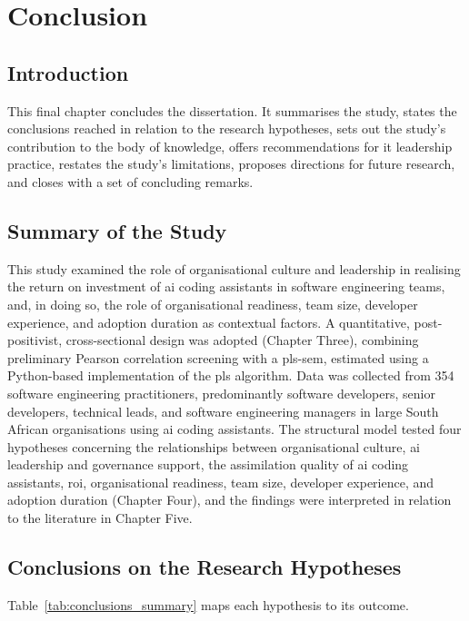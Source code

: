 \chapter{Conclusion} %
\label{cha:ch6_conclusion} %

\section{Introduction}
\label{sec:Ch6 Introduction}
This final chapter concludes the dissertation. It summarises the study, states the conclusions reached in relation to the research hypotheses, sets out the study's contribution to the body of knowledge, offers recommendations for \gls{it}  leadership practice, restates the study's limitations, proposes directions for future research, and closes with a set of concluding remarks.

\section{Summary of the Study}
\label{sec:Summary of the Study}
This study examined the role of organisational culture and leadership in realising the return on investment of \gls{ai} coding assistants in software engineering teams, and, in doing so, the role of organisational readiness, team size, developer experience, and adoption duration as contextual factors. A quantitative, post-positivist, cross-sectional design was adopted (Chapter Three), combining preliminary Pearson correlation screening with a \gls{pls-sem}, estimated using a Python-based implementation of the \gls{pls} algorithm. Data was collected from 354 software engineering practitioners, predominantly software developers, senior developers, technical leads, and software engineering managers in large South African organisations using \gls{ai} coding assistants. The structural model tested four hypotheses concerning the relationships between organisational culture, \gls{ai} leadership and governance support, the assimilation quality of \gls{ai} coding assistants, \gls{roi}, organisational readiness, team size, developer experience, and adoption duration (Chapter Four), and the findings were interpreted in relation to the literature in Chapter Five.

\section{Conclusions on the Research Hypotheses}
\label{sec:Conclusions on the Research Hypotheses}
Table~\ref{tab:conclusions_summary} maps each hypothesis to its outcome.

